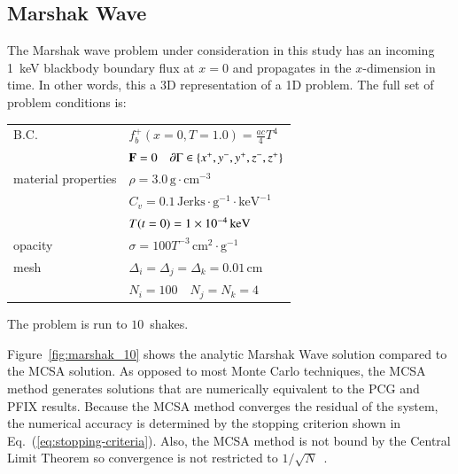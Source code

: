 \documentclass[preprint,12pt]{elsarticle}
\newcommand{\Cv}{\ensuremath{C_{v}}}
\newcommand{\Di}{\ensuremath{\Delta_i}}
\newcommand{\Dj}{\ensuremath{\Delta_j}}
\newcommand{\Dk}{\ensuremath{\Delta_k}}
\begin{document}
\subsection{Marshak Wave}

The Marshak wave problem under consideration in this study has an
incoming 1~keV blackbody boundary flux at $x=0$ and propagates in the
$x$-dimension in time.  In other words, this a 3D representation of a
1D problem.  The full set of problem conditions is:

\begin{center}
  \begin{tabular}{ll}\hline
    B.C. & $f_b^{+}(x=0,T=1.0) = \frac{ac}{4}T^4$ \\ & $\mathbf{F} =
    0\quad \partial\Gamma \in \{x^{+}, y^{-}, y^{+}, z^{-}, z^{+}\}$
    \\ material properties & $\rho =
    3.0\,\text{g}\cdot\text{cm}^{-3}$ \\ & $\Cv =
    0.1\,\text{Jerks}\cdot\text{g}^{-1}\cdot\text{keV}^{-1}$\\ &
    $T(t=0) = 1\times 10^{-4}\,\text{keV}$\\  opacity & $\sigma =
    100T^{-3}\,\text{cm}^2\cdot\text{g}^{-1}$ \\  mesh & $\Di = \Dj
    = \Dk = 0.01\,\text{cm}$ \\ & $N_i = 100\quad N_j = N_k = 4$
    \\ \hline
  \end{tabular}
\end{center}

The problem is run to $10$~shakes.

Figure~\ref{fig:marshak_10} shows the analytic Marshak Wave solution
compared to the MCSA solution.  As opposed to most Monte Carlo
techniques, the MCSA method generates solutions that are numerically
equivalent to the PCG and PFIX results.  Because the MCSA method
converges the residual of the system, the numerical accuracy is
determined by the stopping criterion shown in
Eq.~(\ref{eq:stopping-criteria}).  Also, the MCSA method is not bound
by the Central Limit Theorem so convergence is not restricted to
$1/\sqrt{N}$~\cite{halton_1994,evans_2003}.
\end{document}
